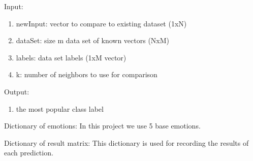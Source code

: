 \documentclass[letterpaper,10pt,english]{sphinxmanual}
\begin{document}
Input:
\begin{enumerate}
\item {} 
newInput: vector to compare to existing dataset (1xN)

\item {} 
dataSet:  size m data set of known vectors (NxM)

\item {} 
labels:      data set labels (1xM vector)

\item {} 
k:           number of neighbors to use for comparison

\end{enumerate}

Output:
\begin{enumerate}
\item {} 
the most popular class label

\end{enumerate}

\begin{fulllineitems}
\label{Documentation of Code:classify.knn.Emotion_dict}
Dictionary of emotions: In this project we use 5 base emotions.

\end{fulllineitems}


\begin{fulllineitems}
\label{Documentation of Code:classify.knn.Matrix_dict}
Dictionary of result matrix: This dictionary is used for recording the results of each prediction.

\end{fulllineitems}

\end{document}
